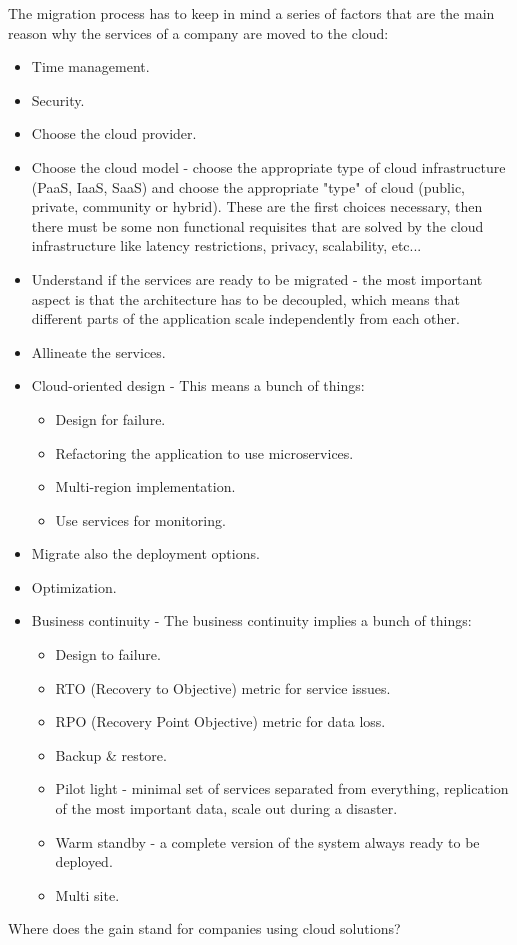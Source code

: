 The migration process has to keep in mind a series of factors that are the main reason why the
services of a company are moved to the cloud:
\begin{itemize}
    \item Time management.
    \item Security.
    \item Choose the cloud provider.
    \item Choose the cloud model - choose the appropriate type of cloud infrastructure (PaaS, IaaS,
        SaaS) and choose the appropriate "type" of cloud (public, private, community or hybrid).
        These are the first choices necessary, then there must be some non functional requisites
        that are solved by the cloud infrastructure like latency restrictions, privacy, scalability,
        etc...
    \item Understand if the services are ready to be migrated - the most important aspect is that
        the architecture has to be decoupled, which means that different parts of the application
        scale independently from each other.
    \item Allineate the services.
    \item Cloud-oriented design - This means a bunch of things:
                        \begin{itemize}
                            \item Design for failure.
                            \item Refactoring the application to use microservices.
                            \item Multi-region implementation.
                            \item Use services for monitoring.
                        \end{itemize}
    \item Migrate also the deployment options.
    \item Optimization.
    \item Business continuity - The business continuity implies a bunch of things:
                \begin{itemize}
                    \item Design to failure.
                    \item RTO (Recovery to Objective) metric for service issues.
                    \item RPO (Recovery Point Objective) metric for data loss.
                    \item Backup \& restore.
                    \item Pilot light - minimal set of services separated from everything,
                        replication of the most important data, scale out during a disaster.
                    \item Warm standby - a complete version of the system always ready to be
                        deployed.
                    \item Multi site.
                \end{itemize}
\end{itemize}
Where does the gain stand for companies using cloud solutions?

